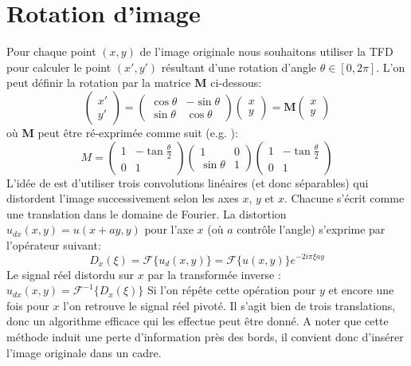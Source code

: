\documentclass[12pt]{article}
\begin{document}
\section*{Rotation d'image}
Pour chaque point $(x, y)$ de l'image originale nous souhaitons utiliser la TFD pour calculer le point $(x', y')$ résultant d'une rotation d'angle  $\theta \in {[0, 2\pi]}$. L'on peut définir la rotation par la matrice \textbf{M} ci-dessous:
$$\begin{pmatrix}
x' \\ y'
\end{pmatrix}=
\begin{pmatrix}
\cos \theta & -\sin \theta \\
\sin \theta & \cos \theta
\end{pmatrix}
\begin{pmatrix}
x \\ y
\end{pmatrix}=\textbf{M}
\begin{pmatrix}
x \\ y
\end{pmatrix}
$$
où \textbf{M} peut être ré-exprimée comme suit (e.g. \cite{paeth86}):
$$M =
\begin{pmatrix}
1 & -\tan \frac{\theta}{2} \\
0 & 1
\end{pmatrix}
\begin{pmatrix}
1 & 0 \\
\sin \theta & 1
\end{pmatrix}
\begin{pmatrix}
1 & -\tan \frac{\theta }{2}\\
0 & 1
\end{pmatrix}
$$
L'idée de \cite{unser95} \cite{larkin97} est d'utiliser trois convolutions linéaires (et donc séparables) qui distordent l'image successivement selon les axes $x$, $y$ et $x$. 
Chacune s'écrit comme une translation dans le domaine de Fourier. La distortion $u_{dx}(x, y) = u(x + ay, y)$ pour l'axe $x$ (où $a$ contrôle l'angle) s'exprime par l'opérateur suivant:
$$ D_x(\xi) = \mathcal{F}\{u_d(x, y)\} = \mathcal{F}\{u(x, y)\} e^{-2 i \pi \xi a y}$$
Le signal réel distordu sur $x$ par la transformée inverse : $ u_{dx}(x, y) = \mathcal{F}^{-1}\{D_x(\xi) \} $ \newline
Si l'on répête cette opération pour $y$ et encore une fois pour $x$ l'on retrouve le signal réel pivoté. Il s'agit bien de trois translations, donc un algorithme efficace qui les effectue peut être donné. A noter que cette méthode induit une perte d'information près des bords, il convient donc d'insérer l'image originale dans un cadre.
\end{document}
